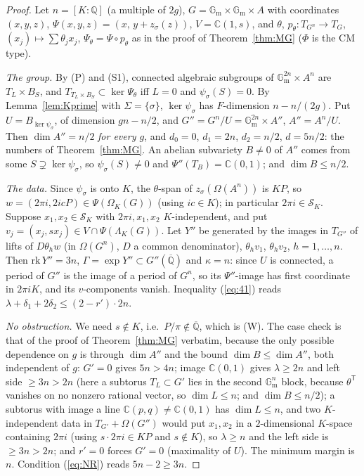\documentclass[11pt]{amsart}
\theoremstyle{definition}
\newcommand{\Qb}{\overline{\mathbb{Q}}}
\newcommand{\C}{\mathbb{C}}
\newcommand{\Q}{\mathbb{Q}}
\newcommand{\Gm}{\mathbb{G}_{\mathrm m}}
\begin{document}
\begin{proof}
Let $n=[K:\Q]$ (a multiple of $2g$), $G=\Gm\times\Gm\times A$ with coordinates $(x,y,z)$, $\Psi(x,y,z)=(x,\,y+z_\sigma(z))$,
$V=\C(1,s)$, and $\theta$, $p_\theta\colon T_{G^n}\to T_G$, $(x_j)\mapsto\sum\theta_jx_j$, $\Psi_\theta=\Psi\circ p_\theta$ as in
the proof of Theorem~\ref{thm:MG} ($\Phi$ is the CM type).

\emph{The group.} By (P) and (S1), connected algebraic subgroups of $\Gm^{2n}\times A^n$ are $T_L\times B_S$, and
$T_{T_L\times B_S}\subset\ker\Psi_\theta$ iff $L=0$ and $\psi_\sigma(S)=0$. By Lemma~\ref{lem:Kprime} with $\Sigma=\{\sigma\}$,
$\ker\psi_\sigma$ has $F$-dimension $n-n/(2g)$. Put $U=B_{\ker\psi_\sigma}$, of dimension $gn-n/2$, and
$G''=G^n/U=\Gm^{2n}\times A''$, $A''=A^n/U$. Then $\dim A''=n/2$ \emph{for every $g$}, and $d_0=0$, $d_1=2n$,
$d_2=n/2$, $d=5n/2$: the numbers of Theorem~\ref{thm:MG}. An abelian subvariety $B\ne0$ of $A''$ comes from some
$S\supsetneq\ker\psi_\sigma$, so $\psi_\sigma(S)\neq0$ and $\Psi''(T_B)=\C(0,1)$; and $\dim B\le n/2$.

\emph{The data.} Since $\psi_\sigma$ is onto $K$, the $\theta$-span of $z_\sigma(\Omega(A^n))$ is $KP$, so
$w=(2\pi i,2icP)\in\Psi(\Omega_K(G))$ (using $ic\in K$); in particular $2\pi i\in\mathcal S_K$. Suppose
$x_1,x_2\in\mathcal S_K$ with $2\pi i,x_1,x_2$ $K$-independent, and put $v_j=(x_j,sx_j)\in V\cap\Psi(\Lambda_K(G))$. Let
$Y''$ be generated by the images in $T_{G''}$ of lifts of $D\theta_hw$ (in $\Omega(G^n)$, $D$ a common denominator),
$\theta_hv_1$, $\theta_hv_2$, $h=1,\dots,n$. Then $\mathrm{rk}\,Y''=3n$, $\Gamma=\exp Y''\subset G''(\Qb)$ and $\kappa=n$:
since $U$ is connected, a period of $G''$ is the image of a period of $G^n$, so its $\Psi''$-image has first coordinate
in $2\pi iK$, and its $v$-components vanish. Inequality (\ref{eq:41}) reads
$\lambda+\delta_1+2\delta_2\le(2-r')\cdot2n$.

\emph{No obstruction.} We need $s\notin K$, i.e.\ $P/\pi\notin\Qb$, which is (W). The case check is that of
the proof of Theorem~\ref{thm:MG} verbatim, because the only possible dependence on $g$ is through $\dim A''$ and the bound
$\dim B\le\dim A''$, both independent of $g$: $G'=0$ gives $5n>4n$; image $\C(0,1)$ gives $\lambda\ge2n$ and left side
$\ge3n>2n$ (here a subtorus $T_L\subset G'$ lies in the second $\Gm^n$ block, because $\theta^{\mathsf T}$ vanishes on no
nonzero rational vector, so $\dim L\le n$; and $\dim B\le n/2$); a subtorus with image a line $\C(p,q)\neq\C(0,1)$ has $\dim L\le n$, and two $K$-independent data in
$T_{G'}+\Omega(G'')$ would put $x_1,x_2$ in a $2$-dimensional $K$-space containing $2\pi i$ (using $s\cdot2\pi i\in KP$
and $s\notin K$), so $\lambda\ge n$ and the left side is $\ge3n>2n$; and $r'=0$ forces $G'=0$ (maximality of $U$). The
minimum margin is $n$. Condition (\ref{eq:NR}) reads $5n-2\ge3n$.
\end{proof}
\end{document}
